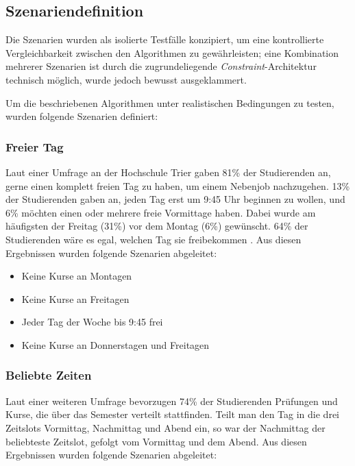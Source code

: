 \subsection{Szenariendefinition}\label{chap:szenariendefinition}

Die Szenarien wurden als isolierte Testfälle konzipiert, um eine kontrollierte Vergleichbarkeit zwischen den Algorithmen zu gewährleisten; eine Kombination mehrerer Szenarien ist durch die zugrundeliegende \textit{Constraint}-Architektur technisch möglich, wurde jedoch bewusst ausgeklammert.

Um die beschriebenen Algorithmen unter realistischen Bedingungen zu testen, wurden folgende Szenarien definiert:



\subsubsection{Freier Tag}\label{scenario_free_day}

Laut einer Umfrage an der Hochschule Trier gaben 81\% der Studierenden an, gerne einen komplett freien Tag zu haben, um einem Nebenjob nachzugehen. 13\% der Studierenden gaben an, jeden Tag erst um 9:45 Uhr beginnen zu wollen, und 6\% möchten einen oder mehrere freie Vormittage haben. Dabei wurde am häufigsten der Freitag (31\%) vor dem Montag (6\%) gewünscht. 64\% der Studierenden wäre es egal, welchen Tag sie freibekommen \cite{trier-2024}. Aus diesen Ergebnissen wurden folgende Szenarien abgeleitet:


\begin{itemize}
  \item Keine Kurse an Montagen
  \item Keine Kurse an Freitagen
  \item Jeder Tag der Woche bis 9:45 frei
  \item Keine Kurse an Donnerstagen und Freitagen
\end{itemize}





\subsubsection{Beliebte Zeiten}

Laut einer weiteren Umfrage \cite{cowling-2002} bevorzugen 74\% der Studierenden Prüfungen und Kurse, die über das Semester verteilt stattfinden. Teilt man den Tag in die drei Zeitslots Vormittag, Nachmittag und Abend ein, so war der Nachmittag der beliebteste Zeitslot, gefolgt vom Vormittag und dem Abend. Aus diesen Ergebnissen wurden folgende Szenarien abgeleitet:


